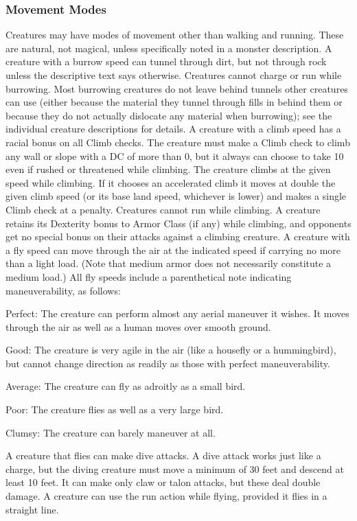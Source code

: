 {\subsubsection{Movement Modes} Creatures may have modes of movement other than walking and running. These are natural, not magical, unless specifically noted in a monster description.
 A creature with a burrow speed can tunnel through dirt, but not through rock unless the descriptive text says otherwise. Creatures cannot charge or run while burrowing. Most burrowing creatures do not leave behind tunnels other creatures can use (either because the material they tunnel through fills in behind them or because they do not actually dislocate any material when burrowing); see the individual creature descriptions for details.
 A creature with a climb speed has a  racial bonus on all Climb checks. The creature must make a Climb check to climb any wall or slope with a DC of more than 0, but it always can choose to take 10 even if rushed or threatened while climbing. The creature climbs at the given speed while climbing. If it chooses an accelerated climb it moves at double the given climb speed (or its base land speed, whichever is lower) and makes a single Climb check at a  penalty. Creatures cannot run while climbing. A creature retains its Dexterity bonus to Armor Class (if any) while climbing, and opponents get no special bonus on their attacks against a climbing creature.
 A creature with a fly speed can move through the air at the indicated speed if carrying no more than a light load. (Note that medium armor does not necessarily constitute a medium load.) All fly speeds include a parenthetical note indicating maneuverability, as follows:
\begin{itemize*}
\item Perfect: The creature can perform almost any aerial maneuver it wishes. It moves through the air as well as a human moves over smooth ground.
\item Good: The creature is very agile in the air (like a housefly or a hummingbird), but cannot change direction as readily as those with perfect maneuverability.
\item Average: The creature can fly as adroitly as a small bird. 
\item Poor: The creature flies as well as a very large bird.
\item Clumsy: The creature can barely maneuver at all.
\end{itemize*}
A creature that flies can make dive attacks. A dive attack works just like a charge, but the diving creature must move a minimum of 30 feet and descend at least 10 feet. It can make only claw or talon attacks, but these deal double damage. A creature can use the run action while flying, provided it flies in a straight line.

}
